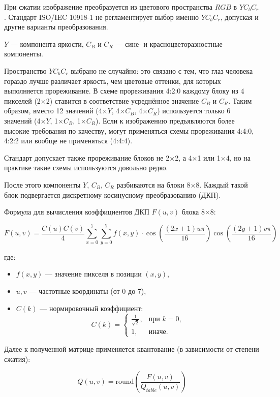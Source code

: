 \documentclass[12pt]{article}
\begin{document}
При сжатии изображение преобразуется из цветового пространства $RGB$ в $YC_{b}C_{r}$.  
Стандарт ISO/IEC 10918-1 не регламентирует выбор именно $YC_{b}C_{r}$,  
допуская и другие варианты преобразования.

$Y$ — компонента яркости, $C_{B}$ и $C_{R}$ — сине- и красноцветоразностные компоненты.

Пространство $YC_{b}C_{r}$ выбрано не случайно: это связано с тем, что глаз человека гораздо лучше  
различает яркость, чем цветовые оттенки, для которых выполняется прореживание.  
В схеме прореживания 4:2:0 каждому блоку из 4 пикселей (2×2) ставится в соответствие  
усреднённое значение $C_{B}$ и $C_{R}$.  
Таким образом, вместо 12 значений (4×$Y$, 4×$C_{B}$, 4×$C_{R}$)  
используется только 6 значений (4×$Y$, 1×$C_{B}$, 1×$C_{R}$).  
Если к изображению предъявляются более высокие требования по качеству,  
могут применяться схемы прореживания 4:4:0, 4:2:2 или вообще не применяться (4:4:4).

Стандарт допускает также прореживание блоков не 2×2, а 4×1 или 1×4,  
но на практике такие схемы используются довольно редко.

После этого компоненты $Y$, $C_{B}$, $C_{R}$ разбиваются на блоки 8×8.  
Каждый такой блок подвергается дискретному косинусному преобразованию (ДКП).

Формула для вычисления коэффициентов ДКП $F(u,v)$ блока 8×8:

\[
    F(u,v) = \frac{C(u)C(v)}{4} \sum_{x=0}^{7} \sum_{y=0}^{7} f(x,y) \cdot \cos\left(\frac{(2x+1)u\pi}{16}\right) \cos\left(\frac{(2y+1)v\pi}{16}\right)
\]

где:
\begin{itemize}
    \item $f(x,y)$ — значение пикселя в позиции $(x,y)$,
    \item $u,v$ — частотные координаты (от 0 до 7),
    \item $C(k)$ — нормировочный коэффициент:
          \[
              C(k) = \begin{cases}
                  \frac{1}{\sqrt{2}}, & \text{при } k=0, \\
                  1,                  & \text{иначе}.
              \end{cases}
          \]
\end{itemize}

Далее к полученной матрице применяется квантование (в зависимости от степени сжатия):

\[
    Q(u, v) = \text{round}\left(\frac{F(u, v)}{Q_{table}(u, v)}\right)
\]
\end{document}
